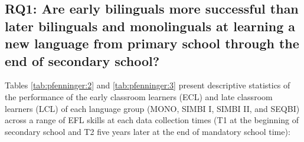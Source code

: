 \documentclass[output=paper,modfonts,nonflat,newtxmath]{langsci/langscibook}
\begin{document}
\subsection{RQ1: {Are} {early} {bilinguals} {more} {successful} {than} {later} {bilinguals} {and} {monolinguals} {at} {learning} {a} {new} {language} {from} {primary} {school} {through} {the} {end} {of} {secondary} {school?} }

Tables \ref{tab:pfenninger:2} and \ref{tab:pfenninger:3} present descriptive statistics of the performance of the early classroom learners (ECL) and late classroom learners (LCL) of each language group (MONO, SIMBI I, SIMBI II, and SEQBI) across a range of EFL skills at each data collection times (T1 at the beginning of secondary school and T2 five years later at the end of mandatory school time):
\end{document}
